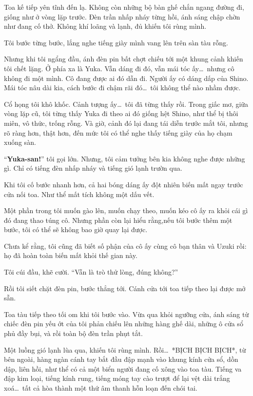 \documentclass[../main.tex]{subfiles}
\begin{document}
\ct

Toa kế tiếp yên tĩnh đến lạ. Không còn những bộ bàn ghế chắn ngang đường đi, giống như ở vòng lặp trước. Đèn trần nhấp nháy từng hồi, ánh sáng chập chờn như đang cố thở. Không khí loãng và lạnh, đủ khiến tôi rùng mình.

Tôi bước từng bước, lắng nghe tiếng giày mình vang lên trên sàn tàu rỗng.

Nhưng khi tôi ngẩng đầu, ánh đèn pin bất chợt chiếu tới một khung cảnh khiến tôi chết lặng. Ở phía xa là Yuka. Vẫn dáng đi đó, vẫn mái tóc ấy\dots\ nhưng cô không đi một mình. Cô đang được ai đó dẫn đi. Người ấy có dáng dấp của Shino. Mái tóc nâu dài kia, cách bước đi chậm rãi đó\dots\ tôi không thể nào nhầm được.

Cổ họng tôi khô khốc. Cảnh tượng ấy\dots\ tôi đã từng thấy rồi. Trong giấc mơ, giữa vòng lặp cũ, tôi từng thấy Yuka đi theo ai đó giống hệt Shino, như thể bị thôi miên, vô thức, trống rỗng. Và giờ, cảnh đó lại đang tái diễn trước mắt tôi, nhưng rõ ràng hơn, thật hơn, đến mức tôi có thể nghe thấy tiếng giày của họ chạm xuống sàn.

``\textbf{Yuka-san!}'' tôi gọi lớn. Nhưng, tôi cảm tưởng bên kia không nghe được những gì. Chỉ có tiếng đèn nhấp nháy và tiếng gió lạnh trườn qua.

Khi tôi cố bước nhanh hơn, cả hai bóng dáng ấy đột nhiên biến mất ngay trước cửa nối toa. Như thể mất tích không một dấu vết.

Một phần trong tôi muốn gào lên, muốn chạy theo, muốn kéo cô ấy ra khỏi cái gì đó đang thao túng cô. Nhưng phần còn lại hiểu rằng,nếu tôi bước thêm một bước, tôi có thể sẽ không bao giờ quay lại được.

Chưa kể rằng, tôi cũng đã biết số phận của cô ấy cùng cô bạn thân và Uzuki rồi: họ đã hoàn toàn biến mất khỏi thế gian này.

Tôi cúi đầu, khẽ cười. ``Vẫn là trò thử lòng, đúng không?''

Rồi tôi siết chặt đèn pin, bước thẳng tới. Cánh cửa tới toa tiếp theo lại được mở sẵn.

\ct

Toa tàu tiếp theo tối om khi tôi bước vào. Vừa qua khỏi ngưỡng cửa, ánh sáng từ chiếc đèn pin yếu ớt của tôi phản chiếu lên những hàng ghế dài, những ô cửa sổ phủ đầy bụi, và rồi toàn bộ đèn trần phụt tắt.

Một luồng gió lạnh lùa qua, khiến tôi rùng mình. Rồi\dots\ *BỊCH BỊCH BỊCH*, từ bên ngoài, hàng ngàn cánh tay bắt đầu đập mạnh vào khung kính cửa sổ, dồn dập, liên hồi, như thể có cả một biển người đang cố xông vào toa tàu. Tiếng va đập kim loại, tiếng kính rung, tiếng móng tay cào trượt để lại vệt dài trắng xoá\dots\ tất cả hòa thành một thứ âm thanh hỗn loạn đến chói tai.
\end{document}
